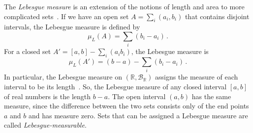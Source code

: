 The \emph{Lebesgue measure} is an extension of the notions of length and area to more complicated sets~\cite{mathworld_lebesgue_measure}. If we have an open set $A = \sum_i (a_i, b_i)$ that contains disjoint intervals, the Lebesgue measure is defined by
\begin{equation}
  \label{eq:2}
  \mu_L(A) = \sum_i (b_i - a_i) \,.
\end{equation}
For a closed set $A' = [a, b] - \sum_i (a_i b_i)$, the Lebesgue measure is
\begin{equation}
  \label{eq:3}
  \mu_L(A') = (b - a) - \sum_i (b_i - a_i) \,.
\end{equation}
In particular, the Lebesgue measure on $(\mathbb{R}, \mathcal{B}_\mathbb{R})$ assigns the measure of each interval to be its length~\cite{chalasani1997}. So, the Lebesgue measure of any closed interval $[a, b]$ of real numbers is the length $b-a$. The open interval $(a, b)$ has the same measure, since the difference between the two sets consists only of the end points $a$ and $b$ and has measure zero. Sets that can be assigned a Lebesgue measure are called \emph{Lebesgue-measurable}.

